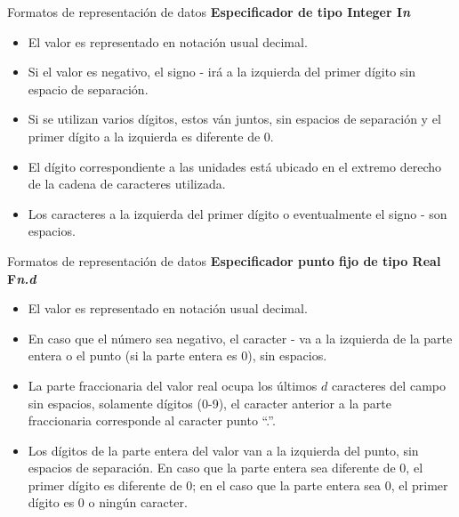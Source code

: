 \begin{frame}[fragile]{Formatos de representación de datos} 
  \textbf{Especificador de tipo Integer I\textit{n}}
    \begin{itemize}[<+(1)->] 
        \item El valor es representado en notación usual decimal.
        \item Si el valor es negativo, el signo - irá a la izquierda del primer dígito sin espacio de separación.
        \item Si se utilizan varios dígitos, estos ván juntos, sin espacios de separación y el primer dígito a la izquierda es diferente de 0.
        \item El dígito correspondiente a las unidades está ubicado en el extremo derecho de la cadena de caracteres utilizada.
        \item Los caracteres a la izquierda del primer dígito o eventualmente el signo - son espacios.
    \end{itemize}
\end{frame}

\begin{frame}[fragile]{Formatos de representación de datos} 
  \textbf{Especificador punto fijo de tipo Real F\textit{n.d}}
    \begin{itemize}[<+(1)->] 
        \item El valor es representado en notación usual decimal.
        \item En caso que el número sea negativo, el caracter - va a la izquierda de la parte entera o el punto (si la parte entera es 0), sin espacios.
        \item La parte fraccionaria del valor real ocupa los últimos $d$ caracteres del campo sin espacios, solamente dígitos (0-9), el caracter anterior a la parte fraccionaria corresponde al caracter punto “.”.
        \item Los dígitos de la parte entera del valor van a la izquierda del punto, sin espacios de separación. En caso que la parte entera sea diferente de 0, el primer dígito es diferente de 0; en el caso que la parte entera sea 0, el primer dígito es 0 o ningún caracter.
    \end{itemize}
\end{frame}

